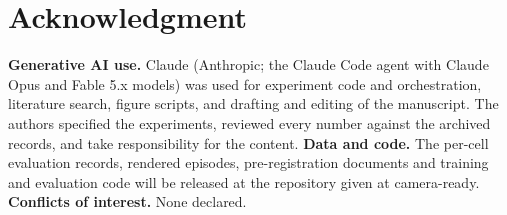 \documentclass[conference]{IEEEtran}
\begin{document}
\section*{Acknowledgment}
\textbf{Generative AI use.} Claude (Anthropic; the Claude Code agent with Claude Opus and Fable 5.x models) was used for experiment code and orchestration, literature search, figure scripts, and drafting and editing of the manuscript. The authors specified the experiments, reviewed every number against the archived records, and take responsibility for the content.
\textbf{Data and code.} The per-cell evaluation records, rendered episodes, pre-registration documents and training and evaluation code will be released at the repository given at camera-ready.
\textbf{Conflicts of interest.} None declared.



\end{document}
